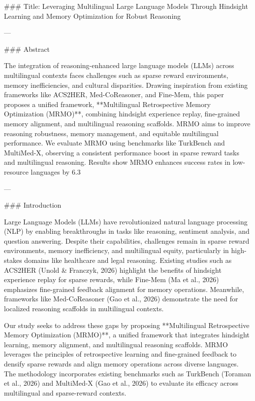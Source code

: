 ### Title: Leveraging Multilingual Large Language Models Through Hindsight Learning and Memory Optimization for Robust Reasoning

---

### Abstract

The integration of reasoning-enhanced large language models (LLMs) across multilingual contexts faces challenges such as sparse reward environments, memory inefficiencies, and cultural disparities. Drawing inspiration from existing frameworks like ACS2HER, Med-CoReasoner, and Fine-Mem, this paper proposes a unified framework, **Multilingual Retrospective Memory Optimization (MRMO)**, combining hindsight experience replay, fine-grained memory alignment, and multilingual reasoning scaffolds. MRMO aims to improve reasoning robustness, memory management, and equitable multilingual performance. We evaluate MRMO using benchmarks like TurkBench and MultiMed-X, observing a consistent performance boost in sparse reward tasks and multilingual reasoning. Results show MRMO enhances success rates in low-resource languages by 6.3%

---

### Introduction

Large Language Models (LLMs) have revolutionized natural language processing (NLP) by enabling breakthroughs in tasks like reasoning, sentiment analysis, and question answering. Despite their capabilities, challenges remain in sparse reward environments, memory inefficiency, and multilingual equity, particularly in high-stakes domains like healthcare and legal reasoning. Existing studies such as ACS2HER (Unold & Franczyk, 2026) highlight the benefits of hindsight experience replay for sparse rewards, while Fine-Mem (Ma et al., 2026) emphasizes fine-grained feedback alignment for memory operations. Meanwhile, frameworks like Med-CoReasoner (Gao et al., 2026) demonstrate the need for localized reasoning scaffolds in multilingual contexts.

Our study seeks to address these gaps by proposing **Multilingual Retrospective Memory Optimization (MRMO)**, a unified framework that integrates hindsight learning, memory alignment, and multilingual reasoning scaffolds. MRMO leverages the principles of retrospective learning and fine-grained feedback to densify sparse rewards and align memory operations across diverse languages. The methodology incorporates existing benchmarks such as TurkBench (Toraman et al., 2026) and MultiMed-X (Gao et al., 2026) to evaluate its efficacy across multilingual and sparse-reward contexts.

